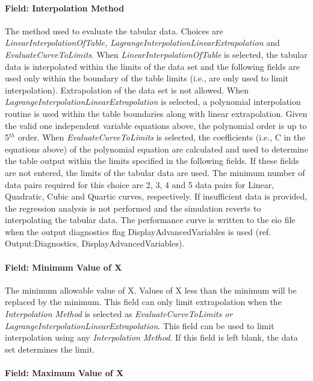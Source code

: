\paragraph{Field: Interpolation Method}\label{field-interpolation-method}

The method used to evaluate the tabular data. Choices are \emph{LinearInterpolationOfTable, LagrangeInterpolationLinearExtrapolation} and \emph{EvaluateCurveToLimits}. When \emph{LinearInterpolationOfTable} is selected, the tabular data is interpolated within the limits of the data set and the following fields are used only within the boundary of the table limits (i.e., are only used to limit interpolation). Extrapolation of the data set is not allowed. When \emph{LagrangeInterpolationLinearExtrapolation} is selected, a polynomial interpolation routine is used within the table boundaries along with linear extrapolation. Given the valid one independent variable equations above, the polynomial order is up to 5\(^{th}\) order. When \emph{EvaluateCurveToLimits} is selected, the coefficients (i.e., C in the equations above) of the polynomial equation are calculated and used to determine the table output within the limits specified in the following fields. If these fields are not entered, the limits of the tabular data are used. The minimum number of data pairs required for this choice are 2, 3, 4 and 5 data pairs for Linear, Quadratic, Cubic and Quartic curves, respectively. If insufficient data is provided, the regression analysis is not performed and the simulation reverts to interpolating the tabular data. The performance curve is written to the eio file when the output diagnostics flag DisplayAdvancedVariables is used (ref. Output:Diagnostics, DisplayAdvancedVariables).

\paragraph{Field: Minimum Value of X}\label{field-minimum-value-of-x-000}

The minimum allowable value of X. Values of X less than the minimum will be replaced by the minimum. This field can only limit extrapolation when the \emph{Interpolation Method} is selected as \emph{EvaluateCurveToLimits or LagrangeInterpolationLinearExtrapolation}. This field can be used to limit interpolation using any \emph{Interpolation Method}. If this field is left blank, the data set determines the limit.

\paragraph{Field: Maximum Value of X}\label{field-maximum-value-of-x-000}

